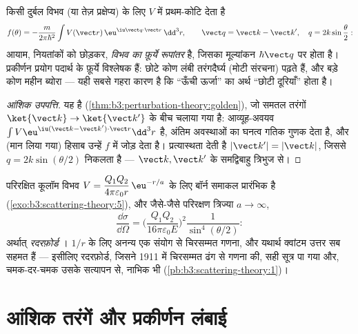 \begin{theorem}[बॉर्न सन्निकटन]\label{thm:b3:scattering-theory:born}
किसी दुर्बल विभव (या तेज़ प्रक्षेप्य) के लिए $V$ में प्रथम-कोटि
 देता है
\[
f(\theta) = -\frac{m}{2\pi\hbar^2}
\int V(\vect r)\,\eu^{\iu\vect q\cdot\vect r}\,\dd^3r ,
\qquad
\vect q = \vect k - \vect k' , \quad
q = 2k\sin\frac\theta2 :
\]
आयाम, नियतांकों को छोड़कर, \emph{विभव का फ़ूर्ये रूपांतर} है, जिसका
मूल्यांकन  $\hbar\vect q$ पर होता है।
प्रकीर्णन प्रयोग पदार्थ के फ़ूर्ये विश्लेषक हैं: छोटे कोण लंबी
तरंगदैर्घ्य (मोटी संरचना) पढ़ते हैं, और बड़े कोण महीन ब्योरा --- यही
सबसे गहरा कारण है कि ``ऊँची ऊर्जा'' का अर्थ ``छोटी दूरियाँ'' होता है।
\end{theorem}

\begin{proof}[आंशिक उपपत्ति]
यह  है
(\cref{thm:b3:perturbation-theory:golden}), जो समतल तरंगों
$\ket{\vect k} \to \ket{\vect k'}$ के बीच चलाया गया है: आव्यूह-अवयव
$\int V\eu^{\iu(\vect k - \vect k')\cdot\vect r}\dd^3r$ है, अंतिम
अवस्थाओं का घनत्व गतिक गुणक देता है, और (मान लिया गया) हिसाब उन्हें
$f$ में जोड़ देता है। प्रत्यास्थता देती है
$|\vect k'| = |\vect k|$, जिससे $q = 2k\sin(\theta/2)$ निकलता है ---
$\vect k, \vect k'$ के समद्विबाहु त्रिभुज से।
\end{proof}

\begin{example}[युकावा से रदरफ़ोर्ड तक]\label{ex:b3:scattering-theory:rutherford}
परिरक्षित कूलॉम विभव $V = \dfrac{Q_1Q_2}{4\pi
\varepsilon_0 r}\,\eu^{-r/a}$ के लिए बॉर्न समाकल प्रारंभिक है
(\cref{exo:b3:scattering-theory:5}), और जैसे-जैसे परिरक्षण त्रिज्या
$a \to \infty$,
\[
\frac{\dd\sigma}{\dd\Omega} =
\Big(\frac{Q_1Q_2}{16\pi\varepsilon_0 E}\Big)^2
\frac{1}{\sin^4(\theta/2)} :
\]
अर्थात् \emph{रदरफ़ोर्ड }। $1/r$ के लिए अनन्य एक संयोग
से चिरसम्मत गणना,  और
यथार्थ क्वांटम उत्तर सब सहमत हैं --- इसीलिए रदरफ़ोर्ड, जिसने 1911 में
चिरसम्मत ढंग से गणना की, सही सूत्र पा गया और, चमक-दर-चमक उसके सत्यापन
से, नाभिक भी
(\cref{pb:b3:scattering-theory:1})।
\end{example}

\section{आंशिक तरंगें और प्रकीर्णन लंबाई}

